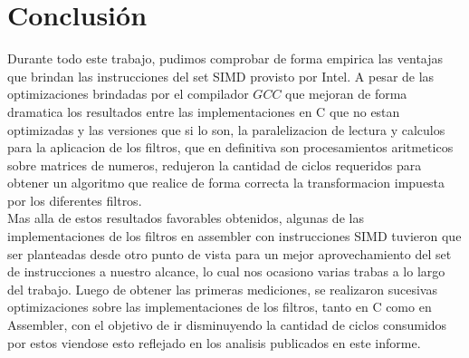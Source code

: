 \documentclass[a4paper,10pt,twoside]{article}
\begin{document}
%
%




\section{Conclusión}
Durante todo este trabajo, pudimos comprobar de forma empirica las ventajas que brindan las instrucciones del set SIMD provisto por Intel. A pesar de las optimizaciones brindadas por el compilador $GCC$ que mejoran de forma dramatica los resultados entre las implementaciones en C que no estan optimizadas y las versiones que si lo son, la paralelizacion de lectura y calculos para la aplicacion de los filtros, que en definitiva son procesamientos aritmeticos sobre matrices de numeros, redujeron la cantidad de ciclos requeridos para obtener un algoritmo que realice de forma correcta la transformacion impuesta por los diferentes filtros.\\
Mas alla de estos resultados favorables obtenidos, algunas de las implementaciones de los filtros en assembler con instrucciones SIMD tuvieron que ser planteadas desde otro punto de vista para un mejor aprovechamiento del set de instrucciones a nuestro alcance, lo cual nos ocasiono varias trabas a lo largo del trabajo. Luego de obtener las primeras mediciones, se realizaron sucesivas optimizaciones sobre las implementaciones de los filtros, tanto en C como en Assembler, con el objetivo de ir disminuyendo la cantidad de ciclos consumidos por estos viendose esto reflejado en los analisis publicados en este informe.
\end{document}
